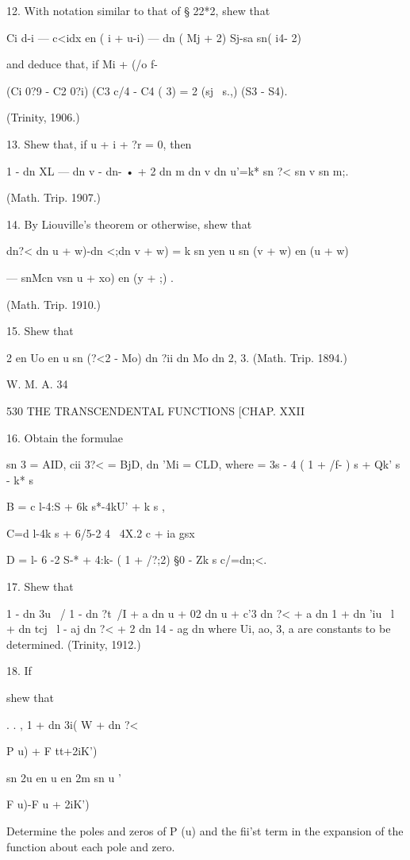 12. With notation similar to that of § 22*2, shew that

Ci d-i — c<idx en ( i + u-i) — dn ( Mj + 2) Sj-sa sn( i4- 2)

and deduce that, if Mi + (/o f-%

(Ci 0?9 - C2 0?i) (C3 c/4 - C4 ( 3) = 2 (sj \ s.,) (S3 - S4).

(Trinity, 1906.)

13. Shew that, if u + i + ?r = 0, then

1 - dn XL — dn v - dn- • + 2 dn m dn v dn u'=k* sn ?< sn v sn m;.

(Math. Trip. 1907.)

14. By Liouville's theorem or otherwise, shew that

dn?< dn u + w)-dn <;dn v + w) = k sn yen u sn (v + w) en (u + w)

— snMcn vsn u + xo) en (y + ;) .

(Math. Trip. 1910.)

15. Shew that

2 en Uo en u sn (?<2 - %
Mo) dn ?ii dn Mo dn %
2, 3. (Math. Trip. 1894.)

W. M. A. 34

530 THE TRANSCENDENTAL FUNCTIONS [CHAP. XXII

16. Obtain the formulae

sn 3 = AID, cii 3?< = BjD, dn 'Mi = CLD, where = 3s - 4 ( 1 + /f- ) s
+ Qk' s - k* s%

B = c l-4:S + 6k s*-4kU' + k s ,

C=d l-4k s + 6/5-2 4 \ 4X.2 c + ia gsx

D = l- 6 -2 S-* + 4:k- ( 1 + /?;2) §0 - Zk s%
c/=dn;<.

17. Shew that

1 - dn 3u \ / 1 - dn ?t\ /I + a dn u + 02 dn u + c'3 dn ?< + a dn 1 +
dn 'iu \ l + dn tcj \ l - aj dn ?< + 2 dn 14 - ag dn %
where Ui, ao, 3, a are constants to be determined. (Trinity, 1912.)

18. If

shew that

  . . , 1 + dn 3i( W + dn ?<

P u) + F tt+2iK')

sn 2u en u en 2m sn u '

F u)-F u + 2iK')

Determine the poles and zeros of P (u) and the fii'st term in the
expansion of the function about each pole and zero.

